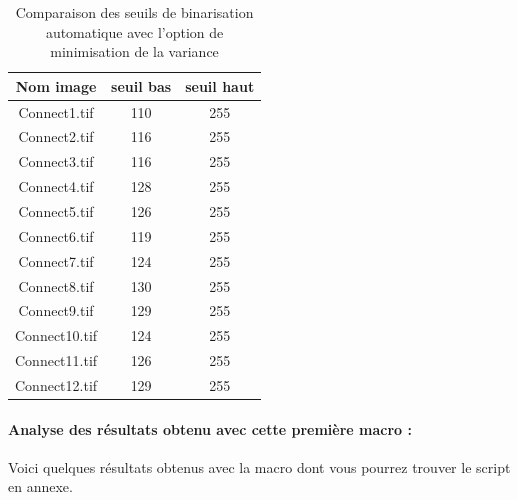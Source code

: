 \documentclass{scrreprt}
\begin{document}
\begin{table}[!h]
        \begin{center}
                \begin{tabular}{|c|c|c|}
                   \hline
                   Nom image & seuil bas & seuil haut \\
                   \hline
                   Connect1.tif & 110  & 255 \\
                   \hline
                   Connect2.tif & 116 & 255  \\
                   \hline
		   Connect3.tif & 116 & 255 \\
                   \hline 
		   Connect4.tif & 128 & 255 \\
                   \hline 
		   Connect5.tif & 126 & 255 \\
                   \hline 
		   Connect6.tif & 119 & 255 \\
                   \hline 
		   Connect7.tif & 124 & 255 \\
                   \hline 
		   Connect8.tif & 130 & 255 \\
                   \hline 
		   Connect9.tif & 129 & 255 \\
                   \hline 
		   Connect10.tif & 124 & 255 \\
		   \hline
 		   Connect11.tif & 126 & 255 \\
                   \hline
		   Connect12.tif & 129 & 255 \\
                   \hline 
 	
                \end{tabular}
        \end{center}
        \caption{Comparaison des seuils de binarisation automatique avec l'option de minimisation de la variance}
\end{table}

\paragraph{Analyse des résultats obtenu avec cette première macro : }
Voici quelques résultats obtenus avec la macro dont vous pourrez trouver le script en annexe.
\end{document}
